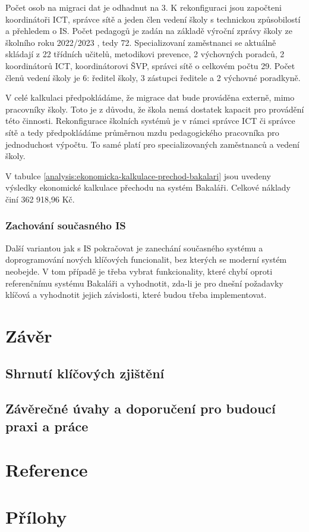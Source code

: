 \documentclass[FM,Proj]{tulthesis}
\begin{document}
Počet osob na migraci dat je odhadnut na 3. K rekonfiguraci jsou započteni koordinátoři 
ICT, správce sítě a jeden člen vedení školy s technickou způsobilostí a přehledem o IS.
Počet pedagogů je zadán na základě výroční zprávy školy ze školního roku 2022/2023 
\cite{spsejecna-vyrocni-zprava-2022-2023}, tedy 72. Specializovaní zaměstnanci se 
aktuálně skládají z 22 třídních učitelů, metodikovi prevence, 2 výchovných poradců, 
2 koordinátorů ICT, koordinátorovi ŠVP, správci sítě o celkovém počtu 29.
Počet členů vedení školy je 6: ředitel školy, 3 zástupci ředitele a 2 výchovné poradkyně.

V celé kalkulaci předpokládáme, že migrace dat bude prováděna externě, mimo pracovníky
školy. Toto je z důvodu, že škola nemá dostatek kapacit pro provádění této činnosti.
Rekonfigurace školních systémů je v rámci správce ICT či správce sítě a tedy 
předpokládáme průměrnou mzdu pedagogického pracovníka pro jednoduchost výpočtu.
To samé platí pro specializovaných zaměstnanců a vedení školy.

V tabulce \ref{analysis:ekonomicka-kalkulace-prechod-bakalari} jsou uvedeny výsledky 
ekonomické kalkulace přechodu na systém Bakaláři. Celkové náklady činí 
362 918,96 Kč.

\subsection{Zachování současného IS}
Další variantou jak s IS pokračovat je zanechání současného systému a doprogramování nových 
klíčových funcionalit, bez kterých se moderní systém neobejde. V tom případě je třeba vybrat
funkcionality, které chybí oproti referenčnímu systému Bakaláři a vyhodnotit, zda-li je
pro dnešní požadavky klíčová a vyhodnotit jejich závislosti, které budou třeba implementovat.




\chapter{Závěr}
\section{Shrnutí klíčových zjištění}
\section{Závěrečné úvahy a doporučení pro budoucí praxi a práce}

\chapter{Reference}
\printbibliography[heading=none]

\chapter{Přílohy}
\end{document}
